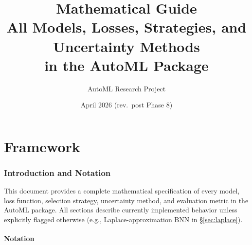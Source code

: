 \documentclass[11pt,a4paper]{article}
\title{\textbf{Mathematical Guide} \\ \Large All Models, Losses, Strategies, and Uncertainty Methods \\ \large in the AutoML Package}
\author{AutoML Research Project}
\date{April 2026 (rev.\ post Phase 8)}
\theoremstyle{definition}
\begin{document}
\maketitle
\tableofcontents
\newpage

\part{Framework}

\section{Introduction and Notation}

This document provides a complete mathematical specification of every model,
loss function, selection strategy, uncertainty method, and evaluation metric
in the AutoML package. All sections describe currently implemented behavior
unless explicitly flagged otherwise (e.g., Laplace-approximation BNN in
§\ref{sec:laplace}).

\subsection{Notation}
\end{document}

